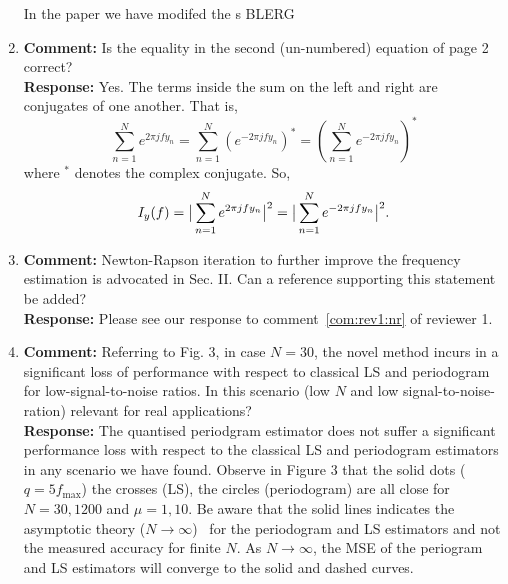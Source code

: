 \documentclass[a4paper,10pt]{article}
\begin{document}
\begin{enumerate}
In the paper we have modifed the s BLERG


\item\textbf{Comment:}
Is the equality in the second (un-numbered) equation of page 2 correct?
\\
\textbf{Response:}
Yes.  The terms inside the sum on the left and right are conjugates of one another.  That is,
\[
\sum_{n=1}^N e^{ 2\pi j f y_n} = \sum_{n=1}^N (e^{-2\pi j f y_n})^* = \left( \sum_{n=1}^N e^{ -2\pi j f y_n} \right)^*
\]
where $^*$ denotes the complex conjugate.  So,
\[
I_y(f) = \big\vert  \sum_{n=1}^N e^{ 2\pi j f y_n}  \big\vert^2 = \big\vert  \sum_{n=1}^N e^{ -2\pi j f y_n}  \big\vert^2.
\]

\item\textbf{Comment:}
Newton-Rapson iteration to further improve the frequency estimation is advocated in Sec. II. Can a reference supporting this statement be added?
\\
\textbf{Response:}
Please see our response to comment~\ref{com:rev1:nr} of reviewer 1.

\item\textbf{Comment:}
Referring to Fig. 3, in case $N=30$, the novel method incurs in a significant loss of performance with respect to classical LS and periodogram for low-signal-to-noise ratios. In this scenario (low $N$ and low signal-to-noise-ration) relevant for real applications?
\\
\textbf{Response:}
The quantised periodgram estimator does not suffer a significant performance loss with respect to the classical LS and periodogram estimators in any scenario we have found.  Observe in Figure 3 that the solid dots ($q=5 f_{\text{max}}$) the crosses (LS), the circles (periodogram) are all close for $N=30,1200$ and $\mu=1,10$.  Be aware that the solid lines indicates the asymptotic theory ($N\to\infty$)~\cite{Quinn_sparse_noisy_SSP_2012,Quinn20013asilomar_period_est} for the periodogram and LS estimators and not the measured accuracy for finite $N$.  As $N\to\infty$, the MSE of the periogram and LS estimators will converge to the solid and dashed curves.

\end{enumerate}



{\small

}
\end{document}
